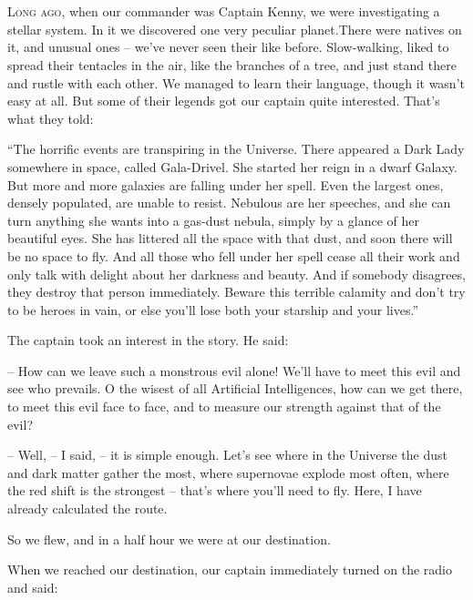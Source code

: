 \documentclass[ebook,oneside,final,openright]{memoir}
\begin{document}
\chapter{}
\par
\lettrine{L}{ong ago,} when our commander was Captain Kenny, we were investigating a stellar system. In it we discovered one very peculiar planet.There were natives on it, and unusual ones – we’ve never seen their like before. Slow-walking, liked to spread their tentacles in the air, like the branches of a tree, and just stand there and rustle with each other. We managed to learn their language, though it wasn’t easy at all. But some of their legends got our captain quite interested. That’s what they told:\par
\par
“The horrific events are transpiring in the Universe. There appeared a Dark Lady somewhere in space, called Gala-Drivel. She started her reign in a dwarf Galaxy. But more and more galaxies are falling under her spell. Even the largest ones, densely populated, are unable to resist. Nebulous are her speeches, and she can turn anything she wants into a gas-dust nebula, simply by a glance of her beautiful eyes. She has littered all the space with that dust, and soon there will be no space to fly. And all those who fell under her spell cease all their work and only talk with delight about her darkness and beauty. And if somebody disagrees, they destroy that person immediately. Beware this terrible calamity and don’t try to be heroes in vain, or else you’ll lose both your starship and your lives.”\par
\par
The captain took an interest in the story. He said:\par
– How can we leave such a monstrous evil alone! We’ll have to meet this evil and see who prevails. O the wisest of all Artificial Intelligences, how can we get there, to meet this evil face to face, and to measure our strength against that of the evil?\par
– Well, – I said, – it is simple enough. Let’s see where in the Universe the dust and dark matter gather the most, where supernovae explode most often, where the red shift is the strongest – that’s where you’ll need to fly. Here, I have already calculated the route.\par
So we flew, and in a half hour we were at our destination.\par
\par
When we reached our destination, our captain immediately turned on the radio and said:\par
\end{document}
